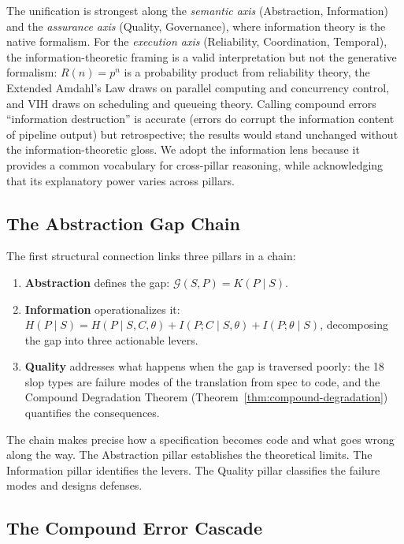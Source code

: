 \documentclass[11pt, a4paper]{googledeepmind}
\begin{document}
The unification is strongest along the \emph{semantic axis} (Abstraction, Information) and the \emph{assurance axis} (Quality, Governance), where information theory is the native formalism. For the \emph{execution axis} (Reliability, Coordination, Temporal), the information-theoretic framing is a valid interpretation but not the generative formalism: $R(n) = p^n$ is a probability product from reliability theory, the Extended Amdahl's Law draws on parallel computing and concurrency control, and VIH draws on scheduling and queueing theory. Calling compound errors ``information destruction'' is accurate (errors do corrupt the information content of pipeline output) but retrospective; the results would stand unchanged without the information-theoretic gloss. We adopt the information lens because it provides a common vocabulary for cross-pillar reasoning, while acknowledging that its explanatory power varies across pillars.

\subsection{The Abstraction Gap Chain}

The first structural connection links three pillars in a chain:

\begin{enumerate}
    \item \textbf{Abstraction} defines the gap: $\mathcal{G}(S,P) = K(P \mid S)$.
    \item \textbf{Information} operationalizes it: $H(P \mid S) = H(P \mid S,C,\theta) + I(P;C \mid S,\theta) + I(P;\theta \mid S)$, decomposing the gap into three actionable levers.
    \item \textbf{Quality} addresses what happens when the gap is traversed poorly: the 18 slop types are failure modes of the translation from spec to code, and the Compound Degradation Theorem (Theorem~\ref{thm:compound-degradation}) quantifies the consequences.
\end{enumerate}

The chain makes precise how a specification becomes code and what goes wrong along the way. The Abstraction pillar establishes the theoretical limits. The Information pillar identifies the levers. The Quality pillar classifies the failure modes and designs defenses.

\subsection{The Compound Error Cascade}
\end{document}

